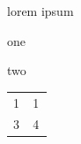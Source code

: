 \label{0}



lorem ipsum

\begin{myitemize}
\item{}one
\item{}two

\end{myitemize}
 


\begin{longtable}{>{\RaggedRight}p{0.47143\linewidth}>{\RaggedRight}p{0.47143\linewidth}} 
\hspace*{0pt}\ignorespaces{}\hspace*{0pt}1&\hspace*{0pt}\ignorespaces{}\hspace*{0pt}1\\ \hspace*{0pt}\ignorespaces{}\hspace*{0pt}3&\hspace*{0pt}\ignorespaces{}\hspace*{0pt}4 
\end{longtable}

